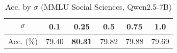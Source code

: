 \begingroup
\renewcommand{\arraystretch}{1}
\begin{table}[t]
    \caption{
        Acc. by $\sigma$ (MMLU Social Sciences, Qwen2.5-7B)}
    \label{tab:acc_mmlu_social_science_entropy_threthold}
    \centering
    \footnotesize
    \begin{tabular}{C{0.095}C{0.07}C{0.07}C{0.07}C{0.07}C{0.07}}
        \toprule
        $\sigma$    & \textbf{0.1} & \textbf{0.25}  & \textbf{0.5} & \textbf{0.75} & \textbf{1.0} \\
        \midrule
        Acc. ($\%$) & 79.40        & \textbf{80.31} & 79.82        & 79.88         & 79.69        \\
        \bottomrule
    \end{tabular}
\end{table}
\endgroup